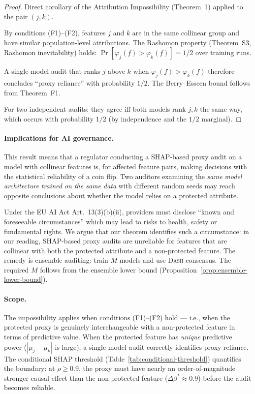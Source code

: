 \documentclass{article}
\newcommand{\DASH}{\textsc{Dash}}
\begin{document}
\begin{proof}
Direct corollary of the Attribution Impossibility (Theorem~1)
applied to the pair $(j, k)$.

By conditions (F1)--(F2), features $j$ and $k$ are in the same
collinear group and have similar population-level attributions.
The Rashomon property (Theorem~S3, Rashomon inevitability) holds:
$\Pr[\varphi_j(f) > \varphi_k(f)] = 1/2$ over training runs.

A single-model audit that ranks $j$ above $k$ when
$\varphi_j(f) > \varphi_k(f)$ therefore concludes ``proxy reliance''
with probability $1/2$. The Berry--Esseen bound follows from
Theorem~F1.

For two independent audits: they agree iff both models rank $j, k$
the same way, which occurs with probability $1/2$ (by independence
and the $1/2$ marginal).
\end{proof}

\paragraph{Implications for AI governance.}
This result means that a regulator conducting a SHAP-based proxy
audit on a model with collinear features is, for affected feature pairs,
making decisions with the statistical reliability of a coin flip.
Two auditors examining the \emph{same model architecture trained on the
same data} with different random seeds may reach opposite conclusions
about whether the model relies on a protected attribute.

Under the EU AI Act Art.~13(3)(b)(ii), providers must disclose
``known and foreseeable circumstances'' which may lead to risks to health, safety or fundamental rights. We argue
that our theorem identifies such a circumstance: in our reading, SHAP-based proxy audits are
unreliable for features that are collinear with both the protected
attribute and a non-protected feature. The remedy is ensemble
auditing: train $M$ models and use \DASH{} consensus. The required
$M$ follows from the ensemble lower bound
(Proposition~\ref{prop:ensemble-lower-bound}).

\paragraph{Scope.}
The impossibility applies when conditions (F1)--(F2) hold ---
i.e., when the protected proxy is genuinely interchangeable with a
non-protected feature in terms of predictive value. When the
protected feature has \emph{unique} predictive power
($|\mu_j - \mu_k|$ is large), a single-model audit correctly
identifies proxy reliance. The conditional SHAP threshold
(Table~\ref{tab:conditional-threshold}) quantifies the boundary:
at $\rho \geq 0.9$, the proxy must have nearly an order-of-magnitude
stronger causal effect than the non-protected feature ($\Delta\beta^*
\approx 0.9$) before the audit becomes reliable.
\end{document}
